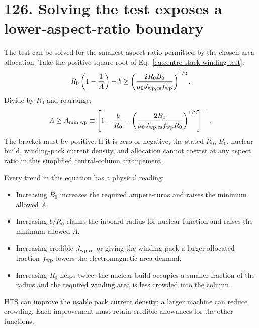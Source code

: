 \documentclass[11pt]{article}
\begin{document}

\section*{126. Solving the test exposes a lower-aspect-ratio boundary}
The test can be solved for the smallest aspect ratio permitted by the chosen area
allocation. Take the positive square root of Eq.~\eqref{eq:centre-stack-winding-test}:
\[
 R_0\left(1-\frac1A\right)-b\ge
 \left(\frac{2R_0B_0}{\mu_0J_{\rm wp,cs}f_{\rm wp}}\right)^{1/2}.
\]
Divide by $R_0$ and rearrange:
\begin{equation}
 A\ge A_{\min,\rm wp}\equiv
\left[
1-\frac{b}{R_0}
-\left(\frac{2B_0}
{\mu_0J_{\rm wp,cs}f_{\rm wp}R_0}\right)^{1/2}
\right]^{-1}.
\label{eq:centre-stack-aspect-bound}
\end{equation}
The bracket must be positive. If it is zero or negative, the stated $R_0$, $B_0$,
nuclear build, winding-pack current density, and allocation cannot coexist at any
aspect ratio in this simplified central-column arrangement.

Every trend in this equation has a physical reading:
\begin{itemize}
\item Increasing $B_0$ increases the required ampere-turns and raises the minimum allowed $A$.
\item Increasing $b/R_0$ claims the inboard radius for nuclear function and raises the minimum allowed $A$.
\item Increasing credible $J_{\rm wp,cs}$ or giving the winding pack a larger allocated
fraction $f_{\rm wp}$ lowers the electromagnetic area demand.
\item Increasing $R_0$ helps twice: the nuclear build occupies a smaller fraction
of the radius and the required winding area is less crowded into the column.
\end{itemize}
HTS can improve the usable pack current density; a larger machine can reduce
crowding. Each improvement must retain credible allowances for the other functions.
\end{document}
